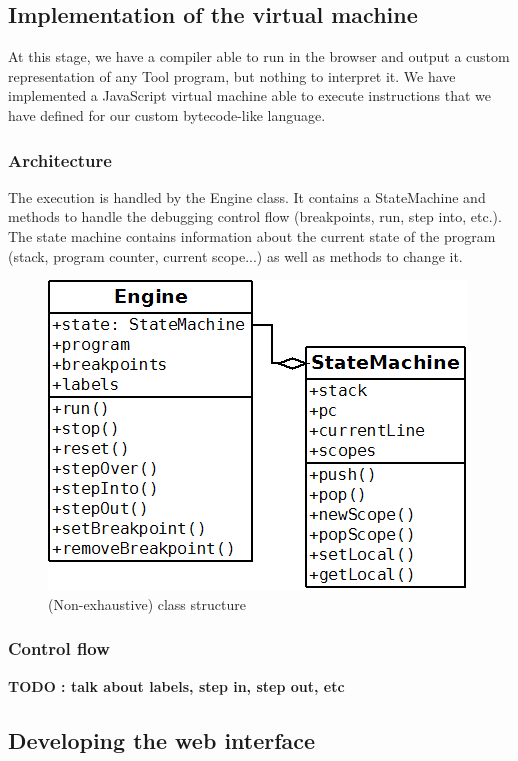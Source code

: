\subsection{Implementation of the virtual machine}

At this stage, we have a compiler able to run in the browser and output a custom representation of any Tool program, but nothing to interpret it.
We have implemented a JavaScript virtual machine able to execute instructions that we have defined for our custom bytecode-like language.

\subsubsection{Architecture}

The execution is handled by the Engine class. It contains a StateMachine and methods to handle the debugging control flow (breakpoints, run, step into, etc.).
The state machine contains information about the current state of the program (stack, program counter, current scope...) as well as methods to change it.\\

\begin{figure}[h]
  \centering
    \includegraphics[scale=0.6]{diag.png}
     \caption{(Non-exhaustive) class structure}
\end{figure}

\subsubsection{Control flow}

\textbf{TODO : talk about labels, step in, step out, etc}

\subsection{Developing the web interface}

